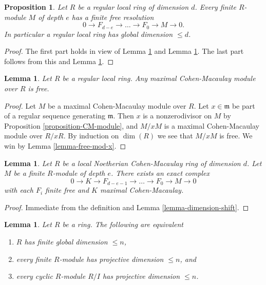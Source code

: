 \documentclass{amsart}
\theoremstyle{plain}
\newtheorem{proposition}[subsection]{Proposition}
\newtheorem{lemma}[subsection]{Lemma}
\theoremstyle{definition}
\theoremstyle{remark}
\numberwithin{equation}{subsection}
\begin{document}
\begin{proposition}
\label{proposition-regular-finite-gl-dim}
Let $R$ be a regular local ring of dimension $d$.
Every finite $R$-module $M$ of depth $e$ has a finite free
resolution
$$
0 \to F_{d-e} \to \ldots \to F_0 \to M \to 0.
$$
In particular a regular local ring has global dimension $\leq d$.
\end{proposition}

\begin{proof}
The first part holds in view of Lemma \ref{lemma-regular-mcm-free}
and Lemma \ref{lemma-mcm-resolution}. The last part follows from this
and Lemma \ref{lemma-finite-gl-dim}.
\end{proof}


\begin{lemma}
\label{lemma-regular-mcm-free}
Let $R$ be a regular local ring.
Any maximal Cohen-Macaulay module over $R$ is free.
\end{lemma}

\begin{proof}
Let $M$ be a maximal Cohen-Macaulay module over $R$.
Let $x \in \mathfrak m$ be part of a regular sequence
generating $\mathfrak m$. Then $x$ is a nonzerodivisor
on $M$ by Proposition \ref{proposition-CM-module}, and
$M/xM$ is a maximal Cohen-Macaulay module over $R/xR$.
By induction on $\dim(R)$ we see that $M/xM$ is free.
We win by Lemma \ref{lemma-free-mod-x}.
\end{proof}


\begin{lemma}
\label{lemma-mcm-resolution}
Let $R$ be a local Noetherian Cohen-Macaulay ring of dimension $d$.
Let $M$ be a finite $R$-module of depth $e$.
There exists an exact complex
$$
0 \to K \to F_{d-e-1} \to \ldots \to F_0 \to M \to 0
$$
with each $F_i$ finite free and $K$ maximal Cohen-Macaulay.
\end{lemma}

\begin{proof}
Immediate from the definition and Lemma \ref{lemma-dimension-shift}.
\end{proof}


\begin{lemma}
\label{lemma-finite-gl-dim}
Let $R$ be a ring. The following are equivalent
\begin{enumerate}
\item $R$ has finite global dimension $\leq n$,
\item every finite $R$-module has projective dimension $\leq n$, and
\item every cyclic $R$-module $R/I$ has projective dimension $\leq n$.
\end{enumerate}
\end{lemma}
\end{document}
